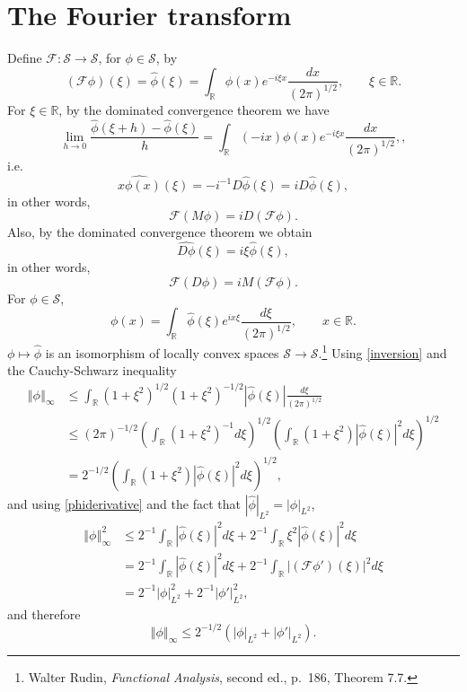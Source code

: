 \documentclass{article}
\newcommand{\norm}[1]{\left\Vert #1 \right\Vert}
\theoremstyle{definition}
\begin{document}
\section{The Fourier transform}
Define $\mathscr{F}:\mathscr{S} \to \mathscr{S}$, for $\phi \in \mathscr{S}$, by
\[
(\mathscr{F}\phi)(\xi)=\hat{\phi}(\xi)= \int_{\mathbb{R}} \phi(x) e^{-i\xi x} \frac{dx}{(2\pi)^{1/2}},
\qquad \xi \in \mathbb{R}.
\]
For $\xi \in \mathbb{R}$, by the dominated convergence theorem we have
\[
\lim_{h \to 0} \frac{\hat{\phi}(\xi+h)-\hat{\phi}(\xi)}{h} = \int_{\mathbb{R}} (-ix) \phi(x) e^{-i\xi x}  \frac{dx}{(2\pi)^{1/2}},,
\]
i.e.
\[
\widehat{x\phi(x)}(\xi) =-i^{-1} D \hat{\phi}(\xi) = iD \hat{\phi}(\xi),
\]
in other words,
\begin{equation}
\mathscr{F}(M\phi) = iD(\mathscr{F}\phi).
\label{xphi}
\end{equation}
Also, by the dominated convergence theorem we obtain
\[
\widehat{D \phi}(\xi) = i\xi \hat{\phi}(\xi),
\]
in other words,
\begin{equation}
\mathscr{F}(D\phi) = iM(\mathscr{F}\phi).
\label{phiderivative}
\end{equation}
For $\phi \in \mathscr{S}$,
\begin{equation}
\phi(x) = \int_{\mathbb{R}} \hat{\phi}(\xi) e^{ix \xi} \frac{d\xi}{(2\pi)^{1/2}},\qquad
x \in \mathbb{R}.
\label{inversion}
\end{equation}
$\phi \mapsto \hat{\phi}$ is an isomorphism of locally convex spaces
$\mathscr{S} \to \mathscr{S}$.\footnote{Walter Rudin, {\em Functional Analysis}, second ed.,
p.~186, Theorem 7.7.}
Using \eqref{inversion} and the Cauchy-Schwarz inequality
\begin{align*}
\norm{\phi}_\infty& \leq \int_{\mathbb{R}} (1+\xi^2)^{1/2} (1+\xi^2)^{-1/2} |\hat{\phi}(\xi)| \frac{d\xi}{(2\pi)^{1/2}}\\
&\leq (2\pi)^{-1/2} \left(\int_{\mathbb{R}} (1+\xi^2)^{-1} d\xi\right)^{1/2} 
\left( \int_{\mathbb{R}} (1+\xi^2) |\hat{\phi}(\xi)|^2 d\xi \right)^{1/2}\\
&=2^{-1/2} \left( \int_{\mathbb{R}} (1+\xi^2) |\hat{\phi}(\xi)|^2 d\xi \right)^{1/2},
\end{align*}
and using  \eqref{phiderivative} and the fact that $|\hat{\phi}|_{L^2}=|\phi|_{L^2}$,
\begin{align*}
\norm{\phi}_\infty^2&\leq 2^{-1}  \int_{\mathbb{R}}  |\hat{\phi}(\xi)|^2 d\xi
+ 2^{-1} \int_{\mathbb{R}} \xi^2 |\hat{\phi}(\xi)|^2 d\xi\\
&=2^{-1}  \int_{\mathbb{R}}  |\hat{\phi}(\xi)|^2 d\xi
+2^{-1} \int_{\mathbb{R}} |(\mathscr{F}\phi')(\xi)|^2 d\xi\\
&=2^{-1} |\phi|_{L^2}^2 + 2^{-1} |\phi'|_{L^2}^2,
\end{align*}
and therefore
\begin{equation}
\norm{\phi}_{\infty} \leq 2^{-1/2}(|\phi|_{L^2} + |\phi'|_{L^2}).
\label{supremum}
\end{equation}
\end{document}

